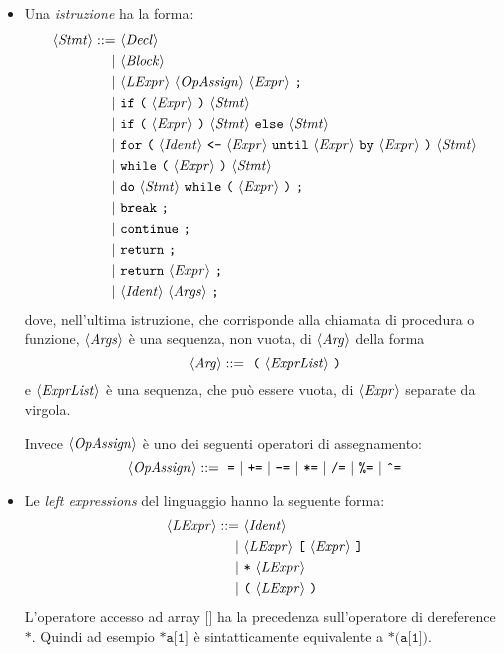 \begin{itemize}
	\item Una \emph{istruzione} ha la forma:
	\begin{align*}
	\langle \mathit{Stmt} \rangle ::=\ &\langle \mathit{Decl} \rangle\\
	|\ &\langle \mathit{Block} \rangle\\
	|\ &\langle \mathit{LExpr} \rangle\ \langle \mathit{OpAssign} \rangle\ \langle \mathit{Expr} \rangle\ \texttt{;}\\
	|\ &\texttt{if}\ \texttt{(}\ \langle \mathit{Expr} \rangle\ \texttt{)}\ \langle \mathit{Stmt} \rangle\\
	|\ &\texttt{if}\ \texttt{(}\ \langle \mathit{Expr} \rangle\ \texttt{)}\ \langle \mathit{Stmt} \rangle\ \texttt{else}\ \langle \mathit{Stmt} \rangle\\
	|\ &\texttt{for}\ \texttt{(}\ \langle \mathit{Ident} \rangle\ \texttt{<-}\ \langle \mathit{Expr} \rangle\ \texttt{until}\ \langle \mathit{Expr} \rangle\ \texttt{by}\ \langle \mathit{Expr} \rangle\ \texttt{)}\ \langle \mathit{Stmt} \rangle\\
	|\ &\texttt{while}\ \texttt{(}\ \langle \mathit{Expr} \rangle\ \texttt{)}\ \langle \mathit{Stmt} \rangle\\
	|\ &\texttt{do}\ \langle \mathit{Stmt} \rangle\ \texttt{while}\ \texttt{(}\ \langle \mathit{Expr} \rangle\ \texttt{)}\ \texttt{;}\\
	|\ &\texttt{break}\ \texttt{;}\\
	|\ &\texttt{continue}\ \texttt{;}\\
	|\ &\texttt{return}\ \texttt{;}\\
	|\ &\texttt{return}\ \langle \mathit{Expr} \rangle\ \texttt{;}\\
	|\ &\langle \mathit{Ident} \rangle\ \langle \mathit{Args} \rangle\ \texttt{;}
	\end{align*}
	dove, nell'ultima istruzione, che corrisponde alla chiamata di procedura o funzione, $\langle \mathit{Args} \rangle$ è una sequenza, non vuota, di $\langle \mathit{Arg} \rangle$ della forma
	\begin{equation*}
	\langle \mathit{Arg} \rangle ::=\ \texttt{(}\ \langle \mathit{ExprList} \rangle\ \texttt{)}
	\end{equation*}
	e $\langle \mathit{ExprList} \rangle$ è una sequenza, che può essere vuota, di $\langle \mathit{Expr} \rangle$ separate da virgola.
	
	Invece $\langle \mathit{OpAssign} \rangle$ è uno dei seguenti operatori di assegnamento:
	\begin{equation*}
	\langle \mathit{OpAssign} \rangle ::=\ \texttt{=}\ |\ \texttt{+=}\ |\ \texttt{-=}\ |\ \texttt{*=}\ |\ \texttt{/=}\ |\ \texttt{\%=}\ |\ \texttt{\^{}=}
	\end{equation*}
	
	\item Le \emph{left expressions} del linguaggio hanno la seguente forma:
	\begin{align*}
	\langle \mathit{LExpr} \rangle ::=\ &\langle \mathit{Ident} \rangle\\
	|\ &\langle \mathit{LExpr} \rangle\ \texttt{[}\ \langle \mathit{Expr} \rangle\ \texttt{]}\\
	|\ &\texttt{*}\ \langle \mathit{LExpr} \rangle\\
	|\ &\texttt{(}\ \langle \mathit{LExpr} \rangle\ \texttt{)}
	\end{align*}
	L'operatore accesso ad array $\texttt{[]}$ ha la precedenza sull'operatore di dereference $\texttt{*}$. Quindi ad esempio $\texttt{*a[1]}$ è sintatticamente equivalente a $\texttt{*(a[1])}$.
	

\end{itemize}
